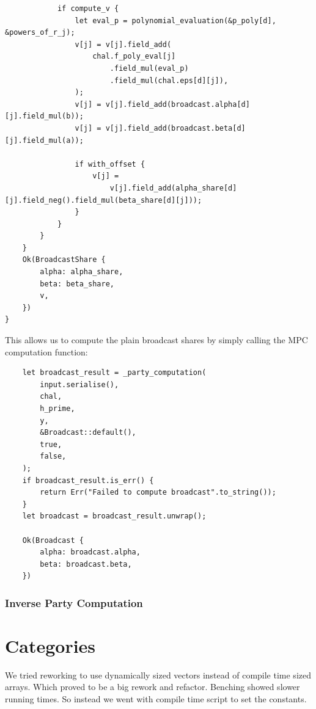 \documentclass[11pt]{report}
\theoremstyle{definition}
\theoremstyle{plain}
\begin{document}
\begin{verbatim}
            if compute_v {
                let eval_p = polynomial_evaluation(&p_poly[d], &powers_of_r_j);
                v[j] = v[j].field_add(
                    chal.f_poly_eval[j]
                        .field_mul(eval_p)
                        .field_mul(chal.eps[d][j]),
                );
                v[j] = v[j].field_add(broadcast.alpha[d][j].field_mul(b));
                v[j] = v[j].field_add(broadcast.beta[d][j].field_mul(a));

                if with_offset {
                    v[j] =
                        v[j].field_add(alpha_share[d][j].field_neg().field_mul(beta_share[d][j]));
                }
            }
        }
    }
    Ok(BroadcastShare {
        alpha: alpha_share,
        beta: beta_share,
        v,
    })
}
\end{verbatim}
This allows us to compute the plain broadcast shares by simply calling the MPC computation function:
\begin{verbatim}
    let broadcast_result = _party_computation(
        input.serialise(),
        chal,
        h_prime,
        y,
        &Broadcast::default(),
        true,
        false,
    );
    if broadcast_result.is_err() {
        return Err("Failed to compute broadcast".to_string());
    }
    let broadcast = broadcast_result.unwrap();

    Ok(Broadcast {
        alpha: broadcast.alpha,
        beta: broadcast.beta,
    })
\end{verbatim}

\subsubsection{Inverse Party Computation}

\section{Categories}\label{sub:categories} %
We tried reworking to use dynamically sized vectors instead of compile time sized arrays. Which proved to be a big rework and refactor. Benching showed slower running times. So instead we went with compile time script to set the constants.
\end{document}
